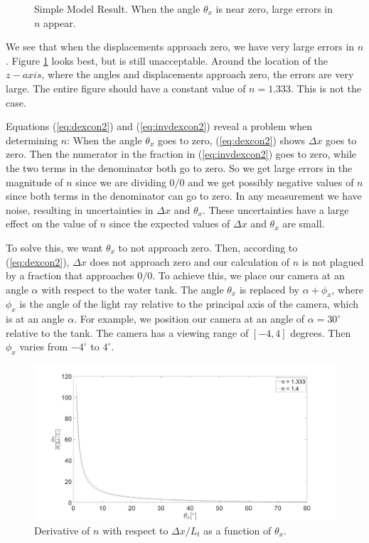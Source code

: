 \documentclass{article}
\begin{document}
\begin{figure}[htbp]
\begin{subfigure}{.45\linewidth}
	\label{fig:nfrontal}
\end{subfigure}
\caption{Simple Model Result. When the angle $\theta_x$ is near zero, large errors in $n$ appear. }
\label{fig:simmod}
\end{figure}

We see that when the displacements approach zero, we have very large errors in $n$. Figure \ref{fig:nfrontal} looks best, but is still unacceptable. Around the location of the $z-axis$, where the angles and displacements approach zero, the errors are very large. The entire figure should have a constant value of $n = 1.333$. This is not the case.
 
Equations (\ref{eq:dexcon2}) and (\ref{eq:invdexcon2}) reveal a problem when determining $n$: When the angle $\theta_x$ goes to zero, (\ref{eq:dexcon2}) shows $\Delta x$ goes to zero. Then the numerator in the fraction in (\ref{eq:invdexcon2}) goes to zero, while the two terms in the denominator both go to zero. So we get large errors in the magnitude of $n$ since we are dividing $0/0$ and we get possibly negative values of $n$ since both terms in the denominator can go to zero. In any measurement we have noise, resulting in uncertainties in $\Delta x$ and $\theta_x$. These uncertainties have a large effect on the value of $n$ since the expected values of $\Delta x$ and $\theta_x$ are small. %

To solve this, we want $\theta_x$ to not approach zero. Then, according to (\ref{eq:dexcon2}), $\Delta x$ does not approach zero and our calculation of $n$ is not plagued by a fraction that approaches $0/0$. To achieve this, we place our camera at an angle $\alpha$ with respect to the water tank. The angle $\theta_x$ is replaced by $\alpha+\phi_x$, where $\phi_x$ is the angle of the light ray relative to the principal axis of the camera, which is at an angle $\alpha$. For example, we position our camera at an angle of $\alpha=30^\circ$ relative to the tank. The camera has a viewing range of $[-4,4]$ degrees. Then $\phi_x$ varies from $-4^\circ$ to $4^\circ$.

\begin{figure}[hpbt]
	\includegraphics[width=\textwidth, keepaspectratio]{dndx.png}
	\caption{Derivative of $n$ with respect to $\Delta x / L_t$ as a function of $\theta_x$.}	
	\label{fig:dndx}
\end{figure}
\end{document}
